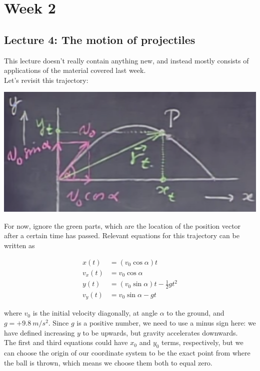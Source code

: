 \documentclass[8.01x]{subfiles}
\begin{document}
\chapter{Week 2}

\section{Lecture 4: The motion of projectiles}

This lecture doesn't really contain anything new, and instead mostly consists of applications of the material covered last week.\\
Let's revisit this trajectory:

\begin{center}
\includegraphics[scale=0.65]{Graphics/2d-motion-decomposed}
\end{center}

For now, ignore the green parts, which are the location of the position vector after a certain time has passed.
Relevant equations for this trajectory can be written as

\begin{align}
x(t) &= (v_0 \cos \alpha) t \label{eq:lec3_x}\\
v_x(t) &= v_0 \cos \alpha\\
y(t) &= (v_0 \sin \alpha) t - \frac{1}{2} g t^2 \label{eq:lec3_y}\\
v_y(t) &= v_0 \sin \alpha - g t
\end{align}

where $v_0$ is the initial velocity diagonally, at angle $\alpha$ to the ground, and $g = +\SI{9.8}{m/s^2}$. Since $g$ is a positive number, we need to use a minus sign here: we have defined increasing $y$ to be upwards, but gravity accelerates downwards.\\
The first and third equations could have $x_0$ and $y_0$ terms, respectively, but we can choose the origin of our coordinate system to be the exact point from where the ball is thrown, which means we choose them both to equal zero.
\end{document}
